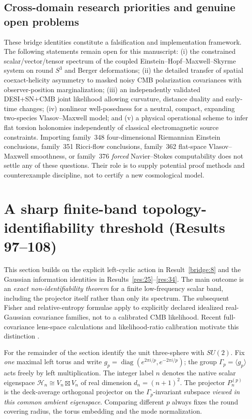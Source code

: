 \documentclass[aps,prd,onecolumn,notitlepage,groupedaddress,11pt]{revtex4-2}
\begin{document}
\subsection{Cross-domain research priorities and genuine open problems}
These bridge identities constitute a falsification and implementation framework. The following statements remain open for this manuscript: (i) the constrained scalar/vector/tensor spectrum of the coupled Einstein--Hopf--Maxwell--Skyrme system on round $S^3$ and Berger deformations; (ii) the detailed transfer of spatial coexact-helicity asymmetry to masked noisy CMB polarization covariances with observer-position marginalization; (iii) an independently validated DESI+SN+CMB joint likelihood allowing curvature, distance duality and early-time changes; (iv) nonlinear well-posedness for a neutral, compact, expanding two-species Vlasov--Maxwell model; and (v) a physical operational scheme to infer flat torsion holonomies independently of classical electromagnetic source constraints.
Importing family~348 four-dimensional Riemannian Einstein conclusions, family~351 Ricci-flow conclusions, family~362 flat-space Vlasov--Maxwell smoothness, or family~376 \emph{forced} Navier--Stokes computability does not settle any of these questions. Their role is to supply potential proof methods and counterexample discipline, not to certify a new cosmological model.

\section{A sharp finite-band topology-identifiability threshold (Results 97--108)}
\label{sec:topology_resolution}
This section builds on the explicit left-cyclic action in Result~\ref{bridge:8} and the Gaussian information identities in Results~\ref{res:25}--\ref{res:34}. The main outcome is an \emph{exact non-identifiability theorem} for a finite low-frequency scalar band, including the projector itself rather than only its spectrum. The subsequent Fisher and relative-entropy formulae apply to explicitly declared idealized real-Gaussian covariance families, not to a calibrated CMB likelihood. Recent full-covariance lens-space calculations and likelihood-ratio calibration motivate this distinction \cite{COMPACT2026Modes,COMPACT2026Detect}.

For the remainder of the section identify the unit three-sphere with $SU(2)$. Fix \emph{one} maximal left torus and write $g_p=\operatorname{diag}(e^{2\pi i/p},e^{-2\pi i/p})$; the group $\Gamma_p=\langle g_p\rangle$ acts freely by left multiplication. The integer label $n$ denotes the native scalar eigenspace $\mathcal H_n\cong V_n\boxtimes V_n$ of real dimension $d_n=(n+1)^2$. The projector $P_n^{(p)}$ is the deck-average orthogonal projector on the $\Gamma_p$-invariant subspace \emph{viewed in this common ambient eigenspace}. Comparing different $p$ always fixes the round covering radius, the torus embedding and the mode normalization.
\end{document}

